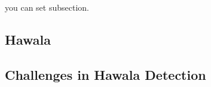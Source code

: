 you can set subsection.

\subsection{Hawala} \label{hawala}


\subsection{Challenges in Hawala Detection} \label{challenges-in-hawala}

